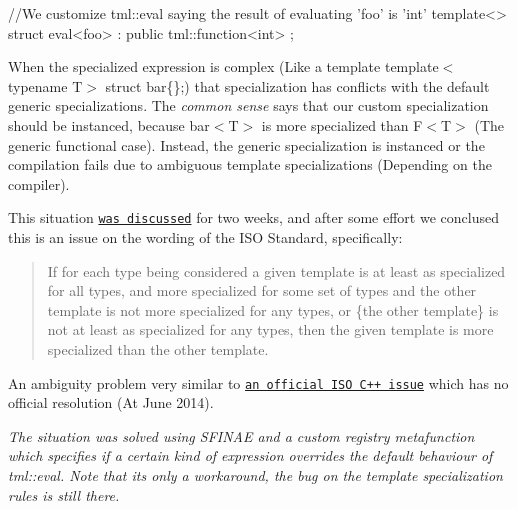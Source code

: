 \begin{DoxyItemize}
\begin{DoxyVerb}
 //We customize tml::eval saying the result of evaluating 'foo' is 'int'
 template<>
 struct eval<foo> : public tml::function<int>
 {};
\end{DoxyVerb}


When the specialized expression is complex (Like a template {\ttfamily template$<$typename T$>$ struct bar\{\};}) that specialization has conflicts with the default generic specializations. The {\itshape common sense} says that our custom specialization should be instanced, because {\ttfamily bar$<$T$>$} is more specialized than {\ttfamily F$<$T$>$} (The generic functional case). Instead, the generic specialization is instanced or the compilation fails due to ambiguous template specializations (Depending on the compiler).

This situation \href{http://stackoverflow.com/questions/23393962/partial-template-template-based-specialization-vs-explicit-partial-template-spec}{\tt was discussed} for two weeks, and after some effort we conclused this is an issue on the wording of the I\+S\+O Standard, specifically\+:
\end{DoxyItemize}

\begin{quote}
If for each type being considered a given template is at least as specialized for all types, and more specialized for some set of types and the other template is not more specialized for any types, or \{the other template\} is not at least as specialized for any types, then the given template is more specialized than the other template. \end{quote}


An ambiguity problem very similar to \href{http://www.open-std.org/jtc1/sc22/wg21/docs/cwg_active.html#1705}{\tt an official I\+S\+O C++ issue} which has no official resolution (At June 2014).

{\itshape The situation was solved using S\+F\+I\+N\+A\+E and a custom registry metafunction which specifies if a certain kind of expression overrides the default behaviour of {\ttfamily tml\+::eval}. Note that its only a workaround, the bug on the template specialization rules is still there.}


